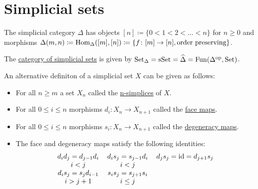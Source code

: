 \section{Simplicial sets}

\begin{defi}
    The simplicial category $\Delta$ has objects $[n] \coloneqq \{ 0<1<2< \dotsc <n\}$ for $n \geq 0$ and morphisms $\Delta(m,n)\coloneqq \operatorname{Hom}_{\Delta}([m],[n]) \coloneqq \{ f \colon[m] \to [n], \text{order preserving} \}$.
\end{defi}

\begin{defi}
    The \underline{category of simplicial sets} is given by $\operatorname{Set}_{\Delta}=\operatorname{sSet}=\widehat{\Delta}= \operatorname{Fun}(\Delta^{\operatorname{op}},\operatorname{Set})$.
\end{defi}

\begin{rmk}
    An alternative definiton of a simplicial set $X$ can be given as follows:
    \begin{itemize}
        \item 
            For all $n\geq m$ a set $X_n$ called the \underline{n-simplices} of $X$.
        \item 
            For all $0 \leq i \leq n$ morphisms $d_i\colon X_n \to X_{n+1}$ called the \underline{face maps}.
        \item 
            For all $0 \leq i \leq n$ morphisms $s_i \colon X_n \to X_{n+1}$
            called the \underline{degeneracy maps}.
        \item 
            The face and degeneracy maps satisfy the following identities:
            \[
            \begin{tabular}{ccc}
                 $d_id_j=d_{j-1}d_i$ & $d_is_j=s_{j-1}d_i$ & $d_js_j=\id=d_{j+1}s_j$  
                 \\
                 $i<j$ & $i<j$ & 
                 \\
                 $d_is_j=s_jd_{i-1}$ & $s_is_j=s_{j+1}s_i$
                 \\
                 $i>j+1$ & $i \leq j$
            \end{tabular}
            \]
    \end{itemize}
\end{rmk}

